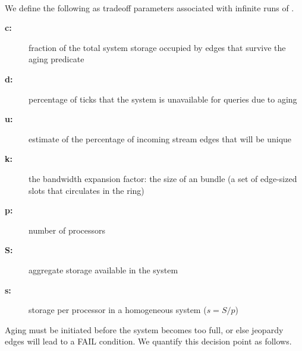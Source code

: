 \begin{tcolorbox}
\begin{definition}
\ \ \\
We define the following as tradeoff parameters associated with infinite runs of \XSCCns.
\label{def:infinite-run-params}
\begin{description}
\item[{\bf c:}] fraction of the total system storage occupied by
edges that survive the aging predicate
\item[{\bf d:}] percentage of \XStream ticks that the system is unavailable for queries due to aging
\item[{\bf u:}] estimate of the percentage of incoming stream edges that will be unique
\item[{\bf k:}] the bandwidth expansion factor: the size of an \XStream bundle (a set of edge-sized slots that circulates in the ring)
\item[{\bf p:}] number of \XStream processors
\item[{\bf S:}] aggregate storage available in the system
\item[{\bf s:}] storage per processor in a homogeneous system ($s = S/p$)
\end{description}
\end{definition}
\end{tcolorbox}

Aging must be initiated before the system becomes too full,
or else jeopardy edges will lead to a FAIL condition.  We quantify this
 decision point as follows.

